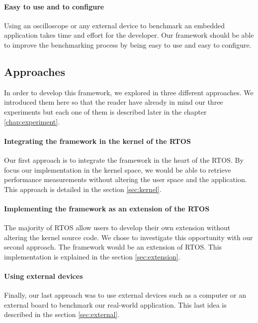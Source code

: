 \paragraph{Easy to use and to configure}
Using an oscilloscope or any external device to benchmark an embedded application takes time and effort for the developer.
Our framework should be able to improve the benchmarking process by being easy to use and easy to configure.

\subsection{Approaches}

In order to develop this framework, we explored in three different approaches.
We introduced them here so that the reader have already in mind our three experiments but each one of them is described later in the chapter \ref{chap:experiment}.

\paragraph{Integrating the framework in the kernel of the RTOS}
Our first approach is to integrate the framework in the heart of the RTOS.
By focus our implementation in the kernel space, we would be able to retrieve performance measurements without altering the user space and the application.
This approach is detailed in the section \ref{sec:kernel}.

\paragraph{Implementing the framework as an extension of the RTOS}
The majority of RTOS allow users to develop their own extension without altering the kernel source code.
We chose to investigate this opportunity with our second approach.
The framework would be an extension of RTOS.
This implementation is explained in the section \ref{sec:extension}.

\paragraph{Using external devices}
Finally, our last approach was to use external devices such as a computer or an external board to benchmark our real-world application.
This last idea is described in the section \ref{sec:external}.
